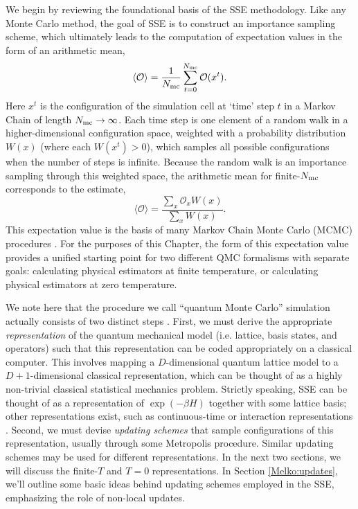 \documentclass[vecphys]{svmult}
\begin{document}
We begin by reviewing the foundational basis of the SSE methodology.  Like any Monte Carlo method, the goal of SSE is to construct an importance sampling scheme, which ultimately leads to the computation of expectation values in the form of an arithmetic mean,
\begin{equation}
\langle \mathcal{O} \rangle  = \frac{1}{N_{\rm mc}} \sum_{t=0}^{N_{\rm mc}} \mathcal{O}(x^t). \label{est1}
\end{equation}
Here $x^t$ is the configuration of the simulation cell at \lq time' step $t$ in a Markov Chain of length $N_{\rm mc} \rightarrow \infty$.
Each time step is one element of a random walk in a higher-dimensional configuration space, weighted with a probability distribution $W(x)$ (where each $W(x^t) > 0$), which samples all possible configurations when the number of steps is infinite.
Because the random walk is an importance sampling through this weighted space, the arithmetic mean for finite-$N_{\rm mc}$ corresponds to the estimate,
\begin{equation}
\langle \mathcal{O} \rangle  = \frac{\sum_x \mathcal{O}_x  W(x)}{\sum_x W(x)}. \label{est2}
\end{equation}
This expectation value is the basis of many Markov Chain Monte Carlo (MCMC) procedures \cite{Melko:Liu}.
For the purposes of this Chapter, the form of this expectation value provides a unified starting point
for two different QMC formalisms with separate goals: calculating physical estimators at finite temperature, or calculating physical estimators at zero temperature.  

We note here that the procedure we call ``quantum Monte Carlo'' simulation actually consists of two distinct steps \cite{Melko:Assaad07}.  First, we must derive the appropriate {\it representation} of the quantum mechanical model (i.e. lattice, basis states, and operators) such that this representation can be coded appropriately on a classical computer.
This involves mapping a $D$-dimensional quantum lattice model to a $D+1$-dimensional classical representation, which can be thought of as a highly non-trivial classical statistical mechanics problem.
Strictly speaking, SSE can be thought of as a representation of $\exp(-\beta H)$ together with some lattice basis; other representations exist, such as continuous-time or interaction representations \cite{Melko:Assaad07}.
Second, we must devise {\it updating schemes} that sample configurations of this representation, usually through some Metropolis procedure.  Similar updating schemes may be used for different representations.
In the next two sections, we will discuss the finite-$T$ and $T=0$ representations.  In Section \ref{Melko:updates}, we'll outline some basic ideas behind updating schemes employed in the SSE, emphasizing the role of non-local updates.  
\end{document}
